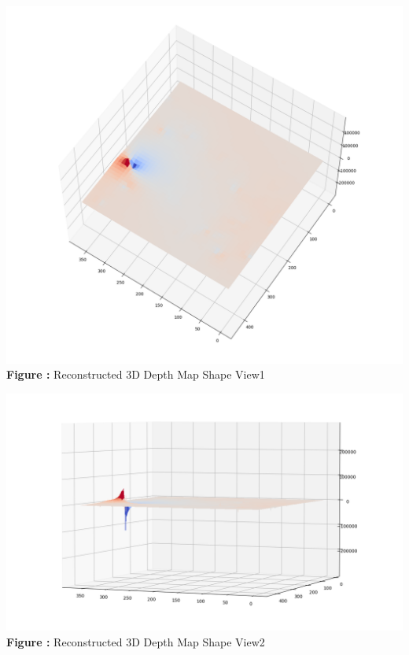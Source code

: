 \documentclass{article}
\begin{document}
	\begin{minipage}{0.48\linewidth}
	\centering
	\includegraphics[width=\linewidth]{./Q2_d_res1.png}
	\textbf{Figure \thefigure:} Reconstructed 3D Depth Map Shape View1  %
	\label{fig:Q2_d_res1}         %
	\end{minipage}
\hfill
	\begin{minipage}{0.48\linewidth}
	\centering
	\includegraphics[width=\linewidth]{./Q2_d_res2.png}
	\textbf{Figure \thefigure:} Reconstructed 3D Depth Map Shape View2  %
	\label{fig:Q2_d_res2}         %
	\end{minipage}
	
\end{document}
